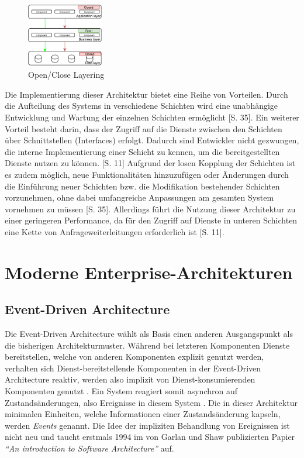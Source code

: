 \documentclass[acmtog]{acmart}
\begin{document}
\begin{figure}[h!]
    \centering
    \includegraphics[width=0.3\textwidth]{images/layer2.pdf}
    \caption{Open/Close Layering}
    \label{fig:layered-request-flow}
\end{figure}


Die Implementierung dieser Architektur bietet eine Reihe von Vorteilen. Durch 
die Aufteilung des Systems in verschiedene Schichten wird eine unabhängige 
Entwicklung und Wartung der einzelnen Schichten ermöglicht \cite{layered2}[S. 35]. 
Ein weiterer Vorteil besteht darin, dass der Zugriff auf die Dienste zwischen den 
Schichten über Schnittstellen (Interfaces) erfolgt. Dadurch sind Entwickler nicht 
gezwungen, die interne Implementierung einer Schicht zu kennen, um die bereitgestellten 
Dienste nutzen zu können. \cite{layered4}[S. 11]
Aufgrund der losen Kopplung der Schichten ist es zudem möglich, neue Funktionalitäten
hinzuzufügen oder Änderungen durch die Einführung neuer Schichten bzw. die Modifikation 
bestehender Schichten vorzunehmen, ohne dabei umfangreiche Anpassungen am gesamten 
System vornehmen zu müssen \cite{layered2}[S. 35].
Allerdings führt die Nutzung dieser Architektur zu einer geringeren Performance, da für 
den Zugriff auf Dienste in unteren Schichten eine Kette von Anfrageweiterleitungen erforderlich ist \cite{layered4}[S. 11].
\section{Moderne Enterprise-Architekturen}

\subsection{Event-Driven Architecture}
Die Event-Driven Architecture wählt als Basis einen anderen Ausgangspunkt als die bisherigen Architekturmuster.
Während bei letzteren Komponenten Dienste bereitstellen, welche von anderen Komponenten explizit genutzt werden,
verhalten sich Dienst-bereitstellende Komponenten in der Event-Driven Architecture reaktiv,
werden also implizit von Dienst-konsumierenden Komponenten genutzt \cite{garlanShawImplizit}.
Ein System reagiert somit asynchron auf Zustandsänderungen, also Ereignisse in diesem System \cite{eda}.
Die in dieser Architektur minimalen Einheiten, welche Informationen einer Zustandsänderung kapseln, werden \textit{Events} genannt.
Die Idee der impliziten Behandlung von Ereignissen ist nicht neu und taucht erstmals 1994 im von Garlan und Shaw publizierten Papier
\textit{\enquote{An introduction to Software Architecture}} auf.
\end{document}
